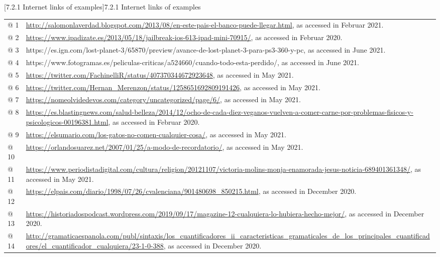 \documentclass[10pt]{article}
\makeatletter
\renewcommand\subsubsection{\@startsection{subsubsection}{3}{0.0cm}{0in}{0.1mm}{\normalfont\normalsize\fontsize{12pt}{14.4pt}\selectfont}}
\makeatother
\begin{document}
\subsubsection[7.2.1 Internet links of examples]{7.2.1 Internet links of examples}
\begin{flushleft}
\tablefirsthead{}
\tablehead{}
\tabletail{}
\tablelasttail{}
\begin{supertabular}{m{0.7955598in}m{5.35876in}}
@ 1  &
\url{http://salomonlaverdad.blogspot.com/2013/08/en-este-pais-el-banco-puede-llegar.html}, as accessed in Februar 2021.\\
@ 2  &
\url{https://www.ipadizate.es/2013/05/18/jailbreak-ios-613-ipad-mini-70915/}, as accessed in Februar 2020.\\
@ 3  &
https://es.ign.com/lost-planet-3/65870/preview/avance-de-lost-planet-3-para-ps3-360-y-pc, as accessed in June 2021.\\
@ 4  &
https://www.fotogramas.es/peliculas-criticas/a524660/cuando-todo-esta-perdido/, as accessed in June 2021.\\
@ 5  &
\url{https://twitter.com/FachinelliR/status/407370344672923648}, as accessed in May 2021.\\
@ 6  &
\url{https://twitter.com/Hernan_Merenzon/status/1258651692809191426}, as accessed in May 2021.\\
@ 7  &
\url{https://nomeolvidedevos.com/category/uncategorized/page/6/}, as accessed in May 2021.\\
@ 8  &
\url{https://es.blastingnews.com/salud-belleza/2014/12/ocho-de-cada-diez-veganos-vuelven-a-comer-carne-por-problemas-fisicos-y-psicologicos-00196381.html}, as accessed in Februar 2020.\\
@ 9  &
\url{https://elsumario.com/los-gatos-no-comen-cualquier-cosa/}, as accessed in May 2021.\\
@ 10  &
\url{https://orlandosuarez.net/2007/01/25/a-modo-de-recordatorio/}, as accessed in May 2021.\\
@ 11  &
\url{https://www.periodistadigital.com/cultura/religion/20121107/victoria-molins-monja-enamorada-jesus-noticia-689401361348/}, as accessed in May 2021.\\
@ 12  &
\url{https://elpais.com/diario/1998/07/26/cvalenciana/901480698_850215.html}, as accessed in December 2020. \\
@ 13  &
\url{https://historiadospodcast.wordpress.com/2019/09/17/magazine-12-cualquiera-lo-hubiera-hecho-mejor/}, as accessed in December 2020.\\
@ 14  &
\url{http://gramaticaespanola.com/publ/sintaxis/los_cuantificadores_ii_caracteristicas_gramaticales_de_los_principales_cuantificadores/el_cuantificador_cualquiera/23-1-0-388}, as accessed in December 2020.\\

\end{supertabular}
\end{flushleft}
\end{document}
